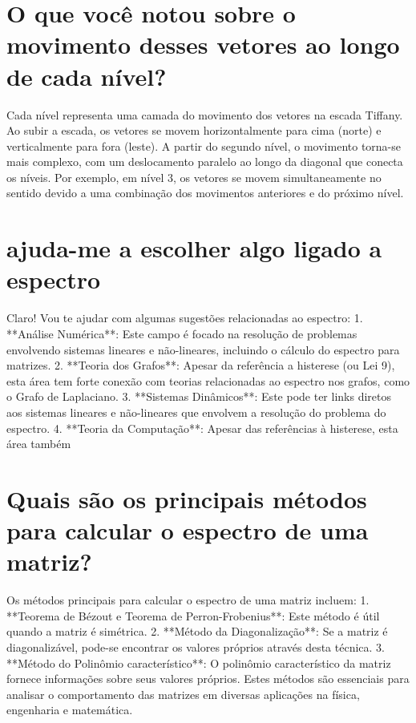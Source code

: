 \documentclass[11pt,a4paper]{article}
\begin{document}
\section{O que você notou sobre o movimento desses vetores ao longo de cada nível?}
Cada nível representa uma camada do movimento dos vetores na escada Tiffany. Ao subir a escada, os vetores se movem horizontalmente para cima (norte) e verticalmente para fora (leste). A partir do segundo nível, o movimento torna-se mais complexo, com um deslocamento paralelo ao longo da diagonal que conecta os níveis. Por exemplo, em nível 3, os vetores se movem simultaneamente no sentido devido a uma combinação dos movimentos anteriores e do próximo nível.

\section{ajuda-me a escolher algo ligado a espectro}
Claro! Vou te ajudar com algumas sugestões relacionadas ao espectro: 1. **Análise Numérica**: Este campo é focado na resolução de problemas envolvendo sistemas lineares e não-lineares, incluindo o cálculo do espectro para matrizes. 2. **Teoria dos Grafos**: Apesar da referência a histerese (ou Lei 9), esta área tem forte conexão com teorias relacionadas ao espectro nos grafos, como o Grafo de Laplaciano. 3. **Sistemas Dinâmicos**: Este pode ter links diretos aos sistemas lineares e não-lineares que envolvem a resolução do problema do espectro. 4. **Teoria da Computação**: Apesar das referências à histerese, esta área também

\section{Quais são os principais métodos para calcular o espectro de uma matriz?}
Os métodos principais para calcular o espectro de uma matriz incluem: 1. **Teorema de Bézout e Teorema de Perron-Frobenius**: Este método é útil quando a matriz é simétrica. 2. **Método da Diagonalização**: Se a matriz é diagonalizável, pode-se encontrar os valores próprios através desta técnica. 3. **Método do Polinômio característico**: O polinômio característico da matriz fornece informações sobre seus valores próprios. Estes métodos são essenciais para analisar o comportamento das matrizes em diversas aplicações na física, engenharia e matemática.
\end{document}
